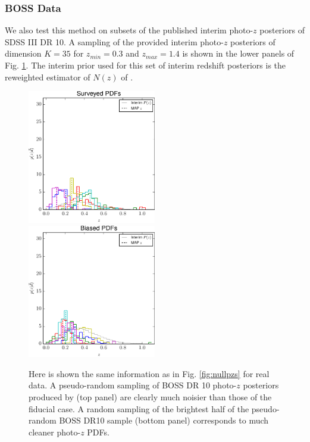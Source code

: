 \documentclass[preprint]{aastex}
\begin{document}
\subsubsection{BOSS Data}
\label{sec:data}

We also test this method on subsets of the published interim photo-$z$ 
posteriors of SDSS III DR 10.  A sampling of the provided interim photo-$z$ 
posteriors of dimension $K=35$ for $z_{min}=0.3$ and $z_{max}=1.4$ is shown in 
the lower panels of Fig. \ref{fig:datapzs}.  The interim prior used for this 
set of interim redshift posteriors is the reweighted estimator of $N(z)$ of 
\citet{Sheldon2012}.

\begin{figure}
\includegraphics[width=0.5\textwidth]{figs/boss/samplepzs.pdf}\\
\includegraphics[width=0.5\textwidth]{figs/bias/samplepzs.pdf}
\caption{Here is shown the same information as in Fig. \ref{fig:nullpzs} for 
real data.  A pseudo-random sampling of BOSS DR 10 photo-$z$ posteriors 
produced by \citet{Sheldon2012} (top panel) are clearly much noisier than those 
of the fiducial case.  A random sampling of the brightest half of the 
pseudo-random BOSS DR10 sample (bottom panel) corresponds to much cleaner 
photo-$z$ PDFs.}
\label{fig:datapzs}
\end{figure}
\end{document}
